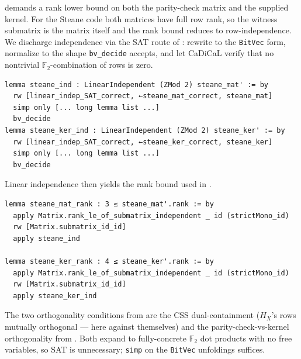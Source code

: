 demands a rank lower bound on both the parity-check matrix and the
supplied kernel. For the Steane code both matrices have full row rank, so the
witness submatrix is the matrix itself and the rank bound reduces to
row-independence. We discharge independence via the SAT route of
: rewrite to the \lstinline{BitVec} form, normalize to the
shape \lstinline{bv_decide} accepts, and let CaDiCaL verify that no nontrivial
$\mathbb{F}_2$-combination of rows is zero.

\begin{lstlisting}
lemma steane_ind : LinearIndependent (ZMod 2) steane_mat' := by
  rw [linear_indep_SAT_correct, ←steane_mat_correct, steane_mat]
  simp only [... long lemma list ...]
  bv_decide
lemma steane_ker_ind : LinearIndependent (ZMod 2) steane_ker' := by
  rw [linear_indep_SAT_correct, ←steane_ker_correct, steane_ker]
  simp only [... long lemma list ...]
  bv_decide
\end{lstlisting}

%

Linear independence then yields the rank bound used in .

\begin{lstlisting}
lemma steane_mat_rank : 3 ≤ steane_mat'.rank := by
  apply Matrix.rank_le_of_submatrix_independent _ id (strictMono_id)
  rw [Matrix.submatrix_id_id]
  apply steane_ind

lemma steane_ker_rank : 4 ≤ steane_ker'.rank := by
  apply Matrix.rank_le_of_submatrix_independent _ id (strictMono_id)
  rw [Matrix.submatrix_id_id]
  apply steane_ker_ind
\end{lstlisting}

%

The two orthogonality conditions from  are the CSS
dual-containment ($H_X$'s rows mutually orthogonal --- here against themselves)
and the parity-check-vs-kernel orthogonality from . Both expand to
fully-concrete $\mathbb{F}_2$ dot products with no free variables, so SAT is
unnecessary; \lstinline{simp} on the \lstinline{BitVec} unfoldings suffices.

